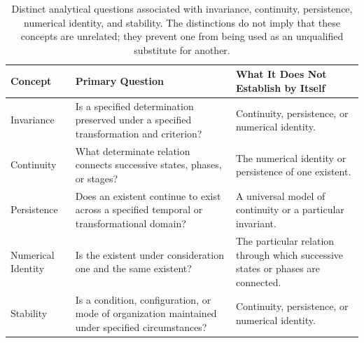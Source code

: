 %
%
%
%

\begin{table}[htbp]
    \centering
    \small
    \renewcommand{\arraystretch}{1.35}
    \setlength{\tabcolsep}{5pt}

    \begin{tabular}{|p{2.7cm}|p{5.0cm}|p{5.0cm}|}
        \hline
        \textbf{Concept} &
        \textbf{Primary Question} &
        \textbf{What It Does Not Establish by Itself}
        \\
        \hline

        Invariance &
        Is a specified determination preserved under
        a specified transformation and criterion? &
        Continuity, persistence, or numerical identity.
        \\
        \hline

        Continuity &
        What determinate relation connects successive
        states, phases, or stages? &
        The numerical identity or persistence of one
        existent.
        \\
        \hline

        Persistence &
        Does an existent continue to exist across a
        specified temporal or transformational domain? &
        A universal model of continuity or a particular
        invariant.
        \\
        \hline

        Numerical Identity &
        Is the existent under consideration one and
        the same existent? &
        The particular relation through which successive
        states or phases are connected.
        \\
        \hline

        Stability &
        Is a condition, configuration, or mode of
        organization maintained under specified
        circumstances? &
        Continuity, persistence, or numerical identity.
        \\
        \hline
    \end{tabular}

    \caption{Distinct analytical questions associated with
    invariance, continuity, persistence, numerical identity,
    and stability. The distinctions do not imply that these
    concepts are unrelated; they prevent one from being used
    as an unqualified substitute for another.}
    \label{tab:ontological-distinctions-related-to-continuity}
\end{table}

